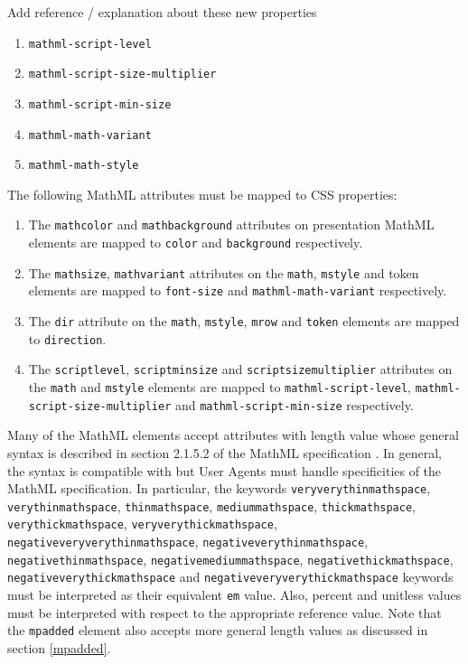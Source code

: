 Add reference / explanation about these new properties 

%
\begin{enumerate}
\item {\tt mathml-script-level}
\item {\tt mathml-script-size-multiplier}
\item {\tt mathml-script-min-size}
\item {\tt mathml-math-variant}
\item {\tt mathml-math-style}
\end{enumerate}

The following MathML attributes must be mapped to CSS properties:
%
\begin{enumerate}
\item The {\tt mathcolor} and {\tt mathbackground} attributes on presentation
  MathML elements are mapped to {\tt color} and {\tt background} respectively.
\item The {\tt mathsize}, {\tt mathvariant} attributes on the {\tt math},
  {\tt mstyle} and token elements are mapped to {\tt font-size} and
  {\tt mathml-math-variant} respectively.
\item The {\tt dir} attribute on the {\tt math}, {\tt mstyle}, {\tt mrow} and
  {\tt token} elements are mapped to {\tt direction}.
\item The {\tt scriptlevel}, {\tt scriptminsize} and {\tt scriptsizemultiplier}
  attributes on the {\tt math} and {\tt mstyle} elements are mapped to
  {\tt mathml-script-level}, {\tt mathml-script-size-multiplier}
  and {\tt mathml-script-min-size} respectively.
\end{enumerate}

Many of the MathML elements accept attributes with length value whose
general syntax is described in section 2.1.5.2 of the MathML specification
\cite{MathML3}. In general,
the syntax is compatible with \cite{CSS2} but User Agents must handle
specificities of the MathML specification. In particular, the keywords
{\tt veryverythinmathspace},
{\tt verythinmathspace},
{\tt thinmathspace},
{\tt mediummathspace},
{\tt thickmathspace},
{\tt verythickmathspace},
{\tt veryverythickmathspace},
{\tt negativeveryverythinmathspace},
{\tt negativeverythinmathspace},
{\tt negativethinmathspace},
{\tt negativemediummathspace},
{\tt negativethickmathspace},
{\tt negativeverythickmathspace} and
{\tt negativeveryverythickmathspace} keywords must be interpreted as their
equivalent {\tt em} value. Also, percent and unitless values must be interpreted
with respect to the appropriate reference value. Note that the {\tt mpadded}
element also accepts more general length values as discussed in section
\ref{mpadded}.

